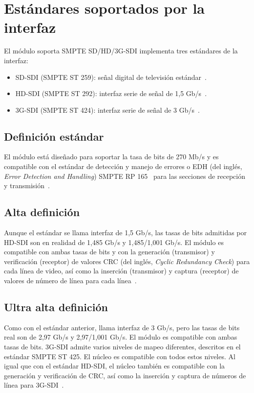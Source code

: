 \section{Estándares soportados por la interfaz}

  El módulo soporta SMPTE SD/HD/3G-SDI implementa tres estándares de la interfaz:

  \begin{itemize}
      \item SD-SDI (SMPTE ST 259): señal digital de televisión estándar~\citep{st259}.
      \item HD-SDI (SMPTE ST 292): interfaz serie de señal de 1,5 Gb/s~\citep{st292}.
      \item 3G-SDI (SMPTE ST 424): interfaz serie de señal de 3 Gb/s~\citep{st424}.
  \end{itemize}

  \subsection{Definición estándar}

  El módulo está diseñado para soportar la tasa de bits de 270 Mb/s y es compatible
  con el estándar de detección y manejo de errores o EDH (del inglés, \textit{Error
  Detection and Handling}) SMPTE RP 165~\citep{st165} para las secciones de
  recepción y transmisión~\citep{castr}.

  \subsection{Alta definición}

  Aunque el estándar se llama interfaz de 1,5 Gb/s, las tasas de bits admitidas
  por HD-SDI son en realidad de 1,485 Gb/s y 1,485/1,001 Gb/s. El módulo es
  compatible con ambas tasas de bits y con la generación (transmisor) y
  verificación (receptor) de valores CRC (del inglés, \textit{Cyclic Redundancy Check})
  para cada línea de video, así como la inserción (transmisor) y captura (receptor)
  de valores de número de línea para cada línea~\citep{castr}.

  \subsection{Ultra alta definición}

  Como con el estándar anterior, llama interfaz de 3 Gb/s, pero las tasas de bits
  real son de 2,97 Gb/s y 2,97/1,001 Gb/s. El módulo es compatible con ambas tasas
  de bits. 3G-SDI admite varios niveles de mapeo diferentes, descritos en el
  estándar SMPTE ST 425. El núcleo es compatible con todos estos niveles. Al
  igual que con el estándar HD-SDI, el núcleo también es compatible con la
  generación y verificación de CRC, así como la inserción y captura de números de
  línea para 3G-SDI\@~\citep{castr}.

